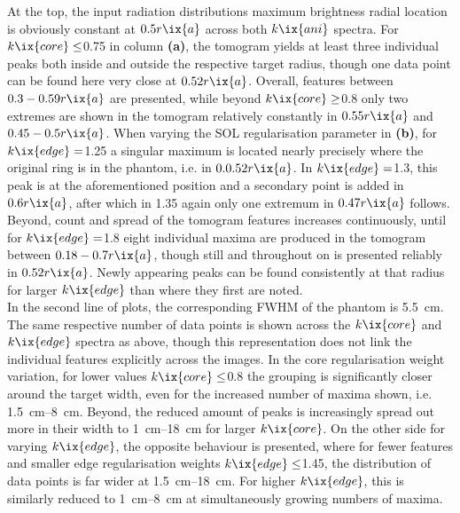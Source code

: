                 At the top, the input radiation distributions maximum brightness radial location is obviously constant at $0.5r\ix{a}$ across both $k\ix{ani}$ spectra. For $k\ix{core}\le$\SI{0.75}{\arbitraryunit} in column \textbf{(a)}, the tomogram yields at least three individual peaks both inside and outside the respective target radius, though one data point can be found here very close at $0.52r\ix{a}$. Overall, features between $0.3-0.59r\ix{a}$ are presented, while beyond $k\ix{core}\ge$\SI{0.8}{\arbitraryunit} only two extremes are shown in the tomogram relatively constantly in $0.55r\ix{a}$ and $0.45-0.5r\ix{a}$. When varying the SOL regularisation parameter in \textbf{(b)}, for $k\ix{edge}=$\SI{1.25}{\arbitraryunit} a singular maximum is located nearly precisely where the original ring is in the phantom, i.e. in $0.0.52r\ix{a}$. In $k\ix{edge}=$\SI{1.3}{\arbitraryunit}, this peak is at the aforementioned position and a secondary point is added in $0.6r\ix{a}$, after which in \SI{1.35}{\arbitraryunit} again only one extremum in $0.47r\ix{a}$ follows. Beyond, count and spread of the tomogram features increases continuously, until for $k\ix{edge}=$\SI{1.8}{\arbitraryunit} eight individual maxima are produced in the tomogram between $0.18-0.7r\ix{a}$, though still and throughout on is presented reliably in $0.52r\ix{a}$. Newly appearing peaks can be found consistently at that radius for larger $k\ix{edge}$ than where they first are noted.\\%
                In the second line of plots, the corresponding FWHM of the phantom is \SI{5.5}{\centi\meter}. The same respective number of data points is shown across the $k\ix{core}$ and $k\ix{edge}$ spectra as above, though this representation does not link the individual features explicitly across the images. In the core regularisation weight variation, for lower values $k\ix{core}\le$\SI{0.8}{\arbitraryunit} the grouping is significantly closer around the target width, even for the increased number of maxima shown, i.e. \SIrange{1.5}{8}{\centi\meter}. Beyond, the reduced amount of peaks is increasingly spread out more in their width to \SIrange{1}{18}{\centi\meter} for larger $k\ix{core}$. On the other side for varying $k\ix{edge}$, the opposite behaviour is presented, where for fewer features and smaller edge regularisation weights $k\ix{edge}\le$\SI{1.45}{\arbitraryunit}, the distribution of data points is far wider at \SIrange{1.5}{18}{\centi\meter}. For higher $k\ix{edge}$, this is similarly reduced to \SIrange{1}{8}{\centi\meter} at simultaneously growing numbers of maxima.\\%
